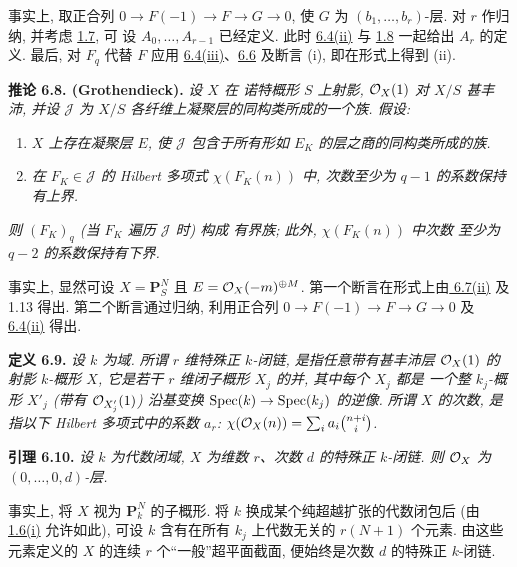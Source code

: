 事实上, 取正合列
$0\longrightarrow F(-1)\longrightarrow F\longrightarrow G\longrightarrow0$, 使 $G$ 为 $(b_1,\ldots,b_r)$-层. 对 $r$ 作归纳, 并考虑 \hyperlink{sga6.e13.lem.1-7}{1.7}, 可
设 $A_0,\ldots,A_{r-1}$ 已经定义.
此时 \hyperlink{sga6.e13.thm.6-4}{6.4(ii)} 与 \hyperlink{sga6.e13.prop.1-8}{1.8} 一起给出
$A_r$ 的定义. 最后, 对 $F_q$ 代替 $F$ 应用 \hyperlink{sga6.e13.thm.6-4}{6.4(iii)}、\hyperlink{sga6.e13.prop.6-6}{6.6} 及断言
(i), 即在形式上得到 (ii).

\textbf{推论 6.8. (Grothendieck).} \emph{设 $X$ 在
诺特概形 $S$ 上射影, $\mathcal O_X(1)$ 对 $X/S$ 甚丰沛, 并设
$\mathcal J$ 为 $X/S$ 各纤维上凝聚层的同构类所成的一个族.
假设:}
\begin{enumerate}[label=(\alph*)]
\item \emph{$X$ 上存在凝聚层 $E$, 使 $\mathcal J$
包含于所有形如
$E_K$ 的层之商的同构类所成的族.}
\item[$(b_q)$] \emph{在 $F_K\in\mathcal J$ 的 Hilbert 多项式 $\chi(F_K(n))$ 中,
次数至少为 $q-1$ 的系数保持
有上界.}
\end{enumerate}
\emph{则 $(F_K)_q$ (当 $F_K$ 遍历 $\mathcal J$ 时) 构成
有界族; 此外, $\chi(F_K(n))$ 中次数
至少为 $q-2$ 的系数保持有下界.}

事实上, 显然可设 $X=\mathbf P^N_S$ 且
$E=\mathcal O_X(-m)^{\oplus M}$. 第一个断言在形式上由\hyperlink{sga6.e13.thm.6-7}{
6.7(ii)} 及 1.13 得出. 第二个断言通过归纳, 利用正合列
$0\longrightarrow F(-1)\longrightarrow F\longrightarrow G\longrightarrow0$
及 \hyperlink{sga6.e13.thm.6-4}{6.4(ii)} 得出.

\textbf{定义 6.9.} \emph{设 $k$ 为域. 所谓
\emph{$r$ 维特殊正 $k$-闭链}, 是指任意带有甚丰沛层 $\mathcal O_X(1)$ 的射影
$k$-概形 $X$, 它是若干
$r$ 维闭子概形 $X_j$ 的并, 其中每个 $X_j$ 都是
一个整 $k_j$-概形 $X'_j$ (带有 $\mathcal O_{X'_j}(1)$) 沿基变换 $\operatorname{Spec}(k)\to\operatorname{Spec}(k_j)$
的逆像. 所谓
$X$ 的\emph{次数}, 是指以下 Hilbert 多项式中的系数 $a_r$:
$\chi(\mathcal O_X(n))=\sum_i a_i\binom{n+i}{i}$.}

\textbf{引理 6.10.} \emph{设 $k$ 为代数闭域, $X$ 为维数 $r$、次数 $d$ 的特殊正 $k$-闭链. 则 $\mathcal O_X$ 为 $(0,\ldots,0,d)$-层.}

事实上, 将 $X$ 视为 $\mathbf P^N_k$ 的子概形. 将 $k$ 换成某个纯超越扩张的代数闭包后 (由 \hyperlink{sga6.e13.prop.1-6}{1.6(i)} 允许如此), 可设 $k$ 含有在所有 $k_j$ 上代数无关的 $r(N+1)$ 个元素. 由这些元素定义的 $X$ 的连续 $r$ 个“一般”超平面截面, 便始终是次数 $d$ 的特殊正 $k$-闭链.

